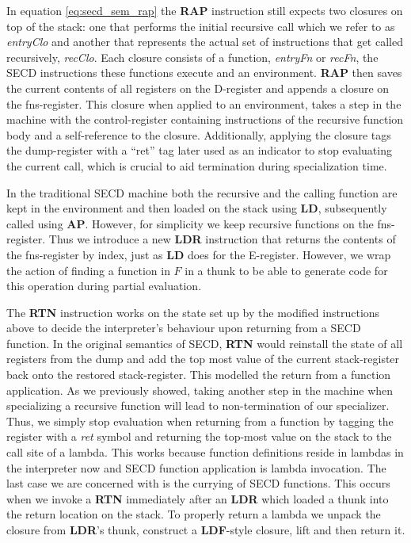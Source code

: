 \documentclass[a4paper,12pt,twoside,openright]{report}
\theoremstyle{definition}
\newcommand{\ts}{\textquotesingle}
\begin{document}
In equation \ref{eq:secd_sem_rap} the \textbf{RAP} instruction still expects two closures on top of the stack: one that performs the initial recursive call which we refer to as \textit{entryClo} and another that represents the actual set of instructions that get called recursively, \textit{recClo}. Each closure consists of a function, \textit{entryFn} or \textit{recFn}, the SECD instructions these functions execute and an environment. \textbf{RAP} then saves the current contents of all registers on the D-register and appends a closure on the fns-register. This closure when applied to an environment, takes a step in the machine with the control-register containing instructions of the recursive function body and a self-reference to the closure. Additionally, applying the closure tags the dump-register with a ``ret'' tag later used as an indicator to stop evaluating the current call, which is crucial to aid termination during specialization time.

In the traditional SECD machine both the recursive and the calling function are kept in the environment and then loaded on the stack using \textbf{LD}, subsequently called using \textbf{AP}. However, for simplicity we keep recursive functions on the fns-register. Thus we introduce a new \textbf{LDR} instruction that returns the contents of the fns-register by index, just as \textbf{LD} does for the E-register. However, we wrap the action of finding a function in $F$ in a thunk to be able to generate code for this operation during partial evaluation.

The \textbf{RTN} instruction works on the state set up by the modified instructions above to decide the interpreter's behaviour upon returning from a SECD function. In the original semantics of SECD, \textbf{RTN} would reinstall the state of all registers from the dump and add the top most value of the current stack-register back onto the restored stack-register. This modelled the return from a function application. As we previously showed, taking another step in the machine when specializing a recursive function will lead to non-termination of our specializer. Thus, we simply stop evaluation when returning from a function by tagging the register with a \textit{{\ts}ret} symbol and returning the top-most value on the stack to the call site of a lambda. This works because function definitions reside in lambdas in the interpreter now and SECD function application is lambda invocation. The last case we are concerned with is the currying of SECD functions. This occurs when we invoke a \textbf{RTN} immediately after an \textbf{LDR} which loaded a thunk into the return location on the stack. To properly return a lambda we unpack the closure from \textbf{LDR}'s thunk, construct a \textbf{LDF}-style closure, lift and then return it.
\end{document}
